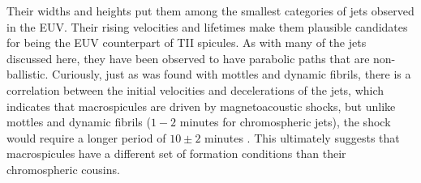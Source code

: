 %
Their widths and heights put them among the smallest categories of jets observed in the EUV. Their rising velocities and lifetimes make them plausible candidates for being the EUV counterpart of TII spicules. As with many of the jets discussed here, they have been observed to have parabolic paths that are non-ballistic. Curiously, just as was found with mottles and dynamic fibrils, there is a correlation between the initial velocities and decelerations of the jets, which indicates that macrospicules are driven by magnetoacoustic shocks, but unlike mottles and dynamic fibrils ($1-2$ minutes for chromospheric jets), the shock would require a longer period of $10\pm 2$ minutes \citep{Loboda2019ApJ871230L}. This ultimately suggests that macrospicules have a different set of formation conditions than their chromospheric cousins.
